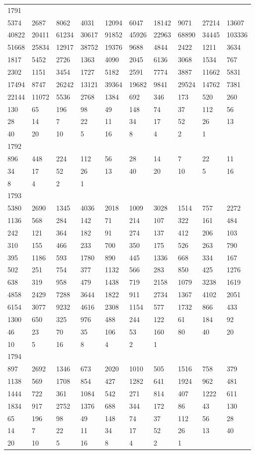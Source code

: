 \begin{longtable}{*{10}{l}}
1791&&&&&&&&&\\
5374& 2687& 8062& 4031& 12094& 6047& 18142& 9071& 27214& 13607\\
40822& 20411& 61234& 30617& 91852& 45926& 22963& 68890& 34445& 103336\\
51668& 25834& 12917& 38752& 19376& 9688& 4844& 2422& 1211& 3634\\
1817& 5452& 2726& 1363& 4090& 2045& 6136& 3068& 1534& 767\\
2302& 1151& 3454& 1727& 5182& 2591& 7774& 3887& 11662& 5831\\
17494& 8747& 26242& 13121& 39364& 19682& 9841& 29524& 14762& 7381\\
22144& 11072& 5536& 2768& 1384& 692& 346& 173& 520& 260\\
130& 65& 196& 98& 49& 148& 74& 37& 112& 56\\
28& 14& 7& 22& 11& 34& 17& 52& 26& 13\\
40& 20& 10& 5& 16& 8& 4& 2& 1& \\

1792&&&&&&&&&\\
896& 448& 224& 112& 56& 28& 14& 7& 22& 11\\
34& 17& 52& 26& 13& 40& 20& 10& 5& 16\\
8& 4& 2& 1& \\

1793&&&&&&&&&\\
5380& 2690& 1345& 4036& 2018& 1009& 3028& 1514& 757& 2272\\
1136& 568& 284& 142& 71& 214& 107& 322& 161& 484\\
242& 121& 364& 182& 91& 274& 137& 412& 206& 103\\
310& 155& 466& 233& 700& 350& 175& 526& 263& 790\\
395& 1186& 593& 1780& 890& 445& 1336& 668& 334& 167\\
502& 251& 754& 377& 1132& 566& 283& 850& 425& 1276\\
638& 319& 958& 479& 1438& 719& 2158& 1079& 3238& 1619\\
4858& 2429& 7288& 3644& 1822& 911& 2734& 1367& 4102& 2051\\
6154& 3077& 9232& 4616& 2308& 1154& 577& 1732& 866& 433\\
1300& 650& 325& 976& 488& 244& 122& 61& 184& 92\\
46& 23& 70& 35& 106& 53& 160& 80& 40& 20\\
10& 5& 16& 8& 4& 2& 1& \\

1794&&&&&&&&&\\
897& 2692& 1346& 673& 2020& 1010& 505& 1516& 758& 379\\
1138& 569& 1708& 854& 427& 1282& 641& 1924& 962& 481\\
1444& 722& 361& 1084& 542& 271& 814& 407& 1222& 611\\
1834& 917& 2752& 1376& 688& 344& 172& 86& 43& 130\\
65& 196& 98& 49& 148& 74& 37& 112& 56& 28\\
14& 7& 22& 11& 34& 17& 52& 26& 13& 40\\
20& 10& 5& 16& 8& 4& 2& 1& \\


\end{longtable}
